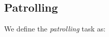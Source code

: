 \documentclass[]{styles/svproc}  %
\begin{document}


%



%



%
%


\subsection{Patrolling}

We define the \emph{patrolling} task as:
\end{document}
